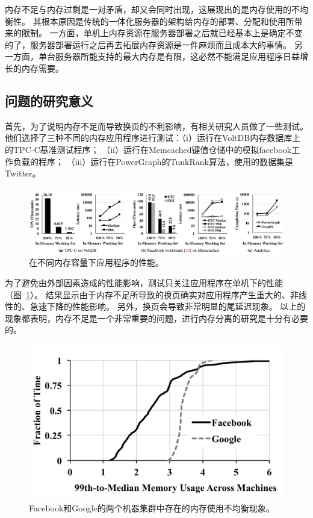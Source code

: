 内存不足与内存过剩是一对矛盾，却又会同时出现，这展现出的是内存使用的不均衡性。
其根本原因是传统的一体化服务器的架构给内存的部署、分配和使用所带来的限制。
一方面，单机上内存资源在服务器部署之后就已经基本上是确定不变的了，服务器部署运行之后再去拓展内存资源是一件麻烦而且成本大的事情。
另一方面，单台服务器所能支持的最大内存是有限，这必然不能满足应用程序日益增长的内存需要。

\subsection{问题的研究意义}
首先，为了说明内存不足而导致换页的不利影响，有相关研究人员做了一些测试\cite{gu2017efficient}。
他们选择了三种不同的内存应用程序进行测试：（i）运行在VoltDB内存数据库上的TPC-C基准测试程序；
（ii）运行在Memcached键值仓储中的模拟facebook工作负载的程序；
（iii）运行在PowerGraph的TunkRank算法，使用的数据集是Twitter。

\begin{figure}
\centering
\includegraphics[scale=0.45]{Figures/memory/memory_motivation1.png}
\decoRule
\caption{在不同内存容量下应用程序的性能\cite{gu2017efficient}。}
\label{fig:memory_motivation1}
\end{figure}

为了避免由外部因素造成的性能影响，测试只关注应用程序在单机下的性能（图~\ref{fig:memory_motivation1}）。
结果显示由于内存不足所导致的换页确实对应用程序产生重大的、非线性的、急速下降的性能影响。
另外，换页会导致非常明显的尾延迟现象。
以上的现象都表明，内存不足是一个非常重要的问题，进行内存分离的研究是十分有必要的。

\begin{figure}
\centering
\includegraphics[scale=0.6]{Figures/memory/memory_motivation2.png}
\decoRule
\caption{Facebook和Google的两个机器集群中存在的内存使用不均衡现象\cite{gu2017efficient}。}
\label{fig:memory_motivation2}
\end{figure}

